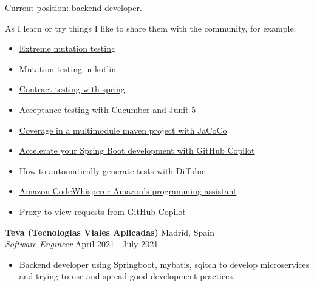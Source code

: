 \documentclass[a4paper]{article}
\begin{document}
Current position: backend developer.

As I learn or try things I like to share them with the community, for example:

\begin{itemize} \itemsep 1pt

\item \href{https://www.adictosaltrabajo.com/2021/08/24/extreme-mutation-testing}{Extreme mutation testing}
\item \href{https://www.adictosaltrabajo.com/2022/02/14/mutation-testing-en-kotlin}{Mutation testing in kotlin}
\item \href{https://www.adictosaltrabajo.com/2022/07/21/contract-testing-con-spring}{Contract testing with spring}
\item \href{https://www.adictosaltrabajo.com/2022/09/06/tests-de-aceptacion-con-cucumber-y-junit-5}{Acceptance testing with Cucumber and Junit 5}
\item \href{https://www.adictosaltrabajo.com/2022/10/10/cobertura-en-un-proyecto-maven-multimodulo-con-jacoco}{Coverage in a multimodule maven project with JaCoCo}
\item \href{https://www.adictosaltrabajo.com/2023/05/11/acelera-tu-desarrollo-en-spring-boot-con-github-copilot}{Accelerate your Spring Boot development with GitHub Copilot}
\item \href{https://www.adictosaltrabajo.com/2023/05/18/como-generar-tests-automaticamente-con-diffblue}{How to automatically generate tests with Diffblue}
\item \href{https://www.adictosaltrabajo.com/2023/05/24/amazon-codewhisperer-el-asistente-de-programacion-de-amazon}{Amazon CodeWhisperer Amazon's programming assistant}
\item \href{https://www.adictosaltrabajo.com/2023/05/29/proxy-para-ver-las-peticiones-de-github-copilot}{Proxy to view requests from GitHub Copilot}
\end{itemize}


\textbf{Teva (Tecnologias Viales Aplicadas)} \hfill Madrid, Spain\\
\textit{Software Engineer} \hfill April 2021 | July 2021\\
\vspace{-1mm}
\begin{itemize} \itemsep 1pt
    \item Backend developer using Springboot, mybatis, sqitch to develop microservices and trying to use and spread good development practices.
\end{itemize}
\end{document}
